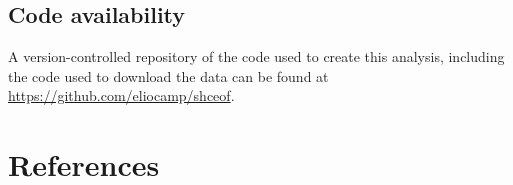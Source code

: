 \documentclass[smallextended]{svjour3}       %
\begin{document}
\hypertarget{code-availability}{%
\subsection*{Code availability}\label{code-availability}}

A version-controlled repository of the code used to create this analysis, including the code used to download the data can be found at \url{https://github.com/eliocamp/shceof}.

\hypertarget{references}{%
\section{References}\label{references}}




\end{document}

